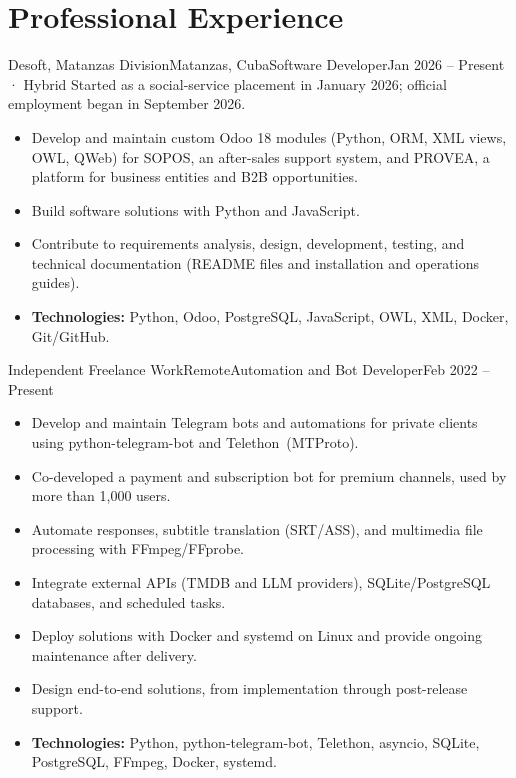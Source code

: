 \section{Professional Experience}

\begin{cvjob}{Desoft, Matanzas Division}{Matanzas, Cuba}{Software Developer}{Jan 2026 – Present · Hybrid}
Started as a social-service placement in January 2026; official employment began in September 2026.

\begin{itemize}
  \item Develop and maintain custom Odoo 18 modules (Python, ORM, XML views, OWL, QWeb) for SOPOS, an after-sales support system, and PROVEA, a platform for business entities and B2B opportunities.
  \item Build software solutions with Python and JavaScript.
  \item Contribute to requirements analysis, design, development, testing, and technical documentation (README files and installation and operations guides).
  \item \textbf{Technologies:} Python, Odoo, PostgreSQL, JavaScript, OWL, XML, Docker, \mbox{Git/GitHub}.
\end{itemize}
\end{cvjob}

\begin{cvjob}{Independent Freelance Work}{Remote}{Automation and Bot Developer}{Feb 2022 – Present}
\begin{itemize}
  \item Develop and maintain Telegram bots and automations for private clients using \mbox{python-telegram-bot} and \mbox{Telethon (MTProto)}.
  \item Co-developed a payment and subscription bot for premium channels, used by more than 1,000 users.
  \item Automate responses, subtitle translation (\mbox{SRT/ASS}), and multimedia file processing with \mbox{FFmpeg/FFprobe}.
  \item Integrate external APIs (TMDB and LLM providers), \mbox{SQLite/PostgreSQL} databases, and scheduled tasks.
  \item Deploy solutions with Docker and \mbox{systemd} on Linux and provide ongoing maintenance after delivery.
  \item Design end-to-end solutions, from implementation through post-release support.
  \item \textbf{Technologies:} Python, \mbox{python-telegram-bot}, Telethon, asyncio, SQLite, PostgreSQL, FFmpeg, Docker, \mbox{systemd}.
\end{itemize}
\end{cvjob}
